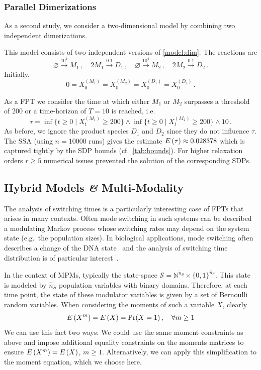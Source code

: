 \subsubsection*{Parallel Dimerizations}
As a second study, we consider a two-dimensional model by combining two
independent dimerizations.
\begin{model}\label{model:double_dim} This model consists of two independent versions of \autoref{model:dim}. The reactions are
\[
    \varnothing\xrightarrow{10^4}M_1\,,\quad
    2M_1\xrightarrow{0.1}D_1\,,\quad
    \varnothing\xrightarrow{10^4}M_2\,,\quad
    2M_2\xrightarrow{0.1}D_2\,.
\]
Initially, \[0=X_0^{(M_1)}=X_0^{(M_2)}=X_0^{(D_1)}=X_0^{(D_2)}\,.\]
\end{model}
As a \ac{FPT} we consider the time at which either $M_1$ or $M_2$ surpasses a threshold of \num{200} or a time-horizon of $T=10$
is reached, i.e.
\[ \tau=\inf\{t\geq 0\mid X_t^{(M_1)} \geq 200\}\land \inf\{t\geq 0\mid X_t^{(M_2)} \geq 200\}\land 10\,.
\]
As before, we ignore the product species $D_1$ and $D_2$ since they do not influence $\tau$.
The \ac{SSA}   (using $n=\num{10000}$ runs) gives the estimate ${E}\left(\tau\right)\approx {0.028378}$ %
which is captured tightly by the \ac{SDP} bounds (cf.\ \autoref{tab:bounds}).
For higher relaxation orders $r \geq 5$  numerical issues prevented the solution of the
corresponding \acp{SDP}.

\subsection{Hybrid Models \textit{\&} Multi-Modality}
The analysis of switching times is a particularly interesting case of \acp{FPT} that
arises in many   contexts.
Often mode switching in such systems can be described a modulating Markov process
whose switching rates may depend on the system state (e.g.\ the population sizes).
In biological applications, mode switching often describes a change of the
\acs{DNA} state~\parencite{hasenauer2014method,stekel2008strong} and the analysis of
switching time distribution is of particular interest~\parencite{spieler2014model,barzel2008calculation}.

In the context of \acp{MPM}, typically the state-space $\mathcal{S}=
\mathbb{N}^{\tilde{n}_S}\times {\{0,1\}}^{\hat{n}_S}$.
This state is modeled by  $\hat{n}_S$ population variables with
binary domains. Therefore, at each time point, the state of these modulator variables
is given by a set of Bernoulli random variables.
When considering the moments of
such a variable $X$, clearly
\[
	{E}\left(X^m\right)={E}\left(X\right)=\Pr(X=1)\,,\quad \forall m\geq 1
\]
We can use this fact two ways: We could use the same moment
constraints
as above and impose additional equality constraints on the moments matrices
to ensure ${E}\left(X^m\right)={E}\left(X\right)$, $m\geq 1$.
Alternatively, we can apply this simplification to the moment equation, which we choose here.

